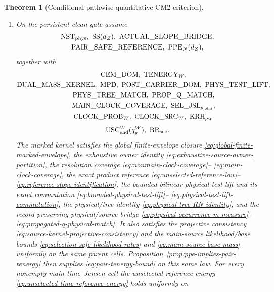 \documentclass[11pt]{article}
\newtheorem{theorem}{Theorem}[section]
\begin{document}
\begin{theorem}[Conditional pathwise quantitative CM2 criterion]
\begin{enumerate}[label=\textup{(H\arabic*)}]
      the signed multiplier bridge;
\item On the persistent clean gate assume
      \[
      \begin{gathered}
       \mathrm{NST}_{\rm phys},\ \mathrm{SS}(d_Z),\
       \mathrm{ACTUAL\_SLOPE\_BRIDGE},\\
       \mathrm{PAIR\_SAFE\_REFERENCE},\ \mathrm{PPE}_{N}(d_Z),
      \end{gathered}
      \]
      together with
      \[
       \begin{gathered}
       \mathrm{CEM\_DOM},\ \mathrm{TENERGY}_{W},\\
       \mathrm{DUAL\_MASS\_KERNEL},\ \mathrm{MPD},\
       \mathrm{POST\_CARRIER\_DOM},\ \mathrm{PHYS\_TEST\_LIFT},\\
       \mathrm{PHYS\_TREE\_MATCH},\ \mathrm{PROP\_Q\_MATCH},\\
       \mathrm{MAIN\_CLOCK\_COVERAGE},\
       \mathrm{SEL\_JSL}_{p_{\rm joint}},\\
       \mathrm{CLOCK\_PROB}_{W},\ \mathrm{CLOCK\_SRC}_{W},\
       \mathrm{KRH}_{p_W}
       \end{gathered}
      \]
      \[
       \mathrm{USC}_{\rm end}^{W}(q_g^W),\ \mathrm{BR}_{\rm sec}.
      \]
      The marked kernel satisfies the global finite-envelope closure
      \eqref{eq:global-finite-marked-envelope}, the exhaustive owner identity
      \eqref{eq:exhaustive-source-owner-partition}, the resolution coverage
      \eqref{eq:nonmain-clock-coverage}--
      \eqref{eq:main-clock-coverage}, the exact product reference
      \eqref{eq:unselected-reference-law}--
      \eqref{eq:reference-slope-identification},
      the bounded bilinear physical-test lift and its exact commutation
      \eqref{eq:bounded-physical-test-lift}--
      \eqref{eq:physical-test-lift-commutation}, the physical/tree identity
      \eqref{eq:physical-tree-RN-identity}, and the record-preserving
      physical/source bridge
      \eqref{eq:physical-occurrence-m-measure}--
      \eqref{eq:propagated-q-physical-match}.  It also satisfies the
      projective consistency
      \eqref{eq:source-kernel-projective-consistency} and the main-source
      likelihood/base
      bounds \eqref{eq:selection-safe-likelihood-rates} and
      \eqref{eq:main-source-base-mass} uniformly on the same parent cells.
      Proposition~\ref{prop:ppe-implies-pair-tenergy} then supplies
      \eqref{eq:pair-tenergy-bound} on this same law.  For every nonempty main time--Jensen cell the unselected reference
      energy \eqref{eq:unselected-time-reference-energy} holds uniformly on

\end{enumerate}
\end{theorem}
\end{document}
